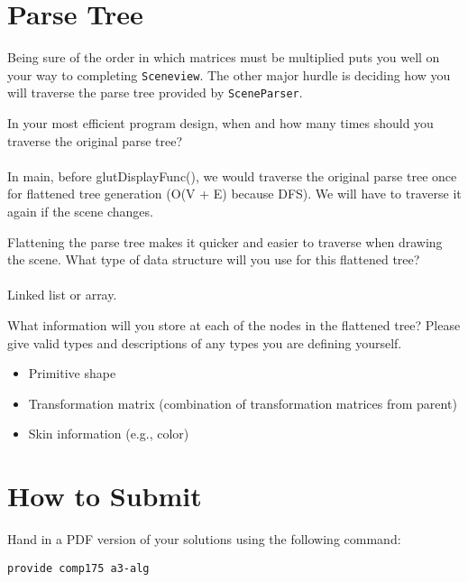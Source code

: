 \documentclass[10pt,twocolumn]{article}
\begin{document}
\section{Parse Tree}
Being sure of the order in which matrices must be multiplied puts you well on your way to completing {\tt Sceneview}. The other major hurdle is deciding how you will traverse the parse tree provided by {\tt SceneParser}.
\begin{framed}
\noindent {\bf [1 point]} In your most efficient program design, when and how many times should you traverse the original parse tree?
\\\\
In main, before glutDisplayFunc(), we would traverse the original parse tree once for flattened tree generation (O(V + E) because DFS). We will have to traverse it again if the scene changes. 
\end{framed}

\begin{framed}
\noindent {\bf [1 point]} Flattening the parse tree makes it quicker and easier to traverse when drawing the scene. What type of data structure will you use for this flattened tree?
\\\\
Linked list or array. 
\end{framed}
\begin{framed}
\noindent {\bf [1 point]} What information will you store at each of the nodes in the flattened tree? Please give valid types and descriptions of any types you are defining yourself.
\begin{itemize}
\item Primitive shape
\item Transformation matrix (combination of transformation matrices from parent)
\item Skin information (e.g., color)
\end{itemize}
\end{framed}

\section{How to Submit}

Hand in a PDF version of your solutions using the following command:
\begin{center}
 {\tt provide comp175 a3-alg}
 \end{center}
\end{document}
